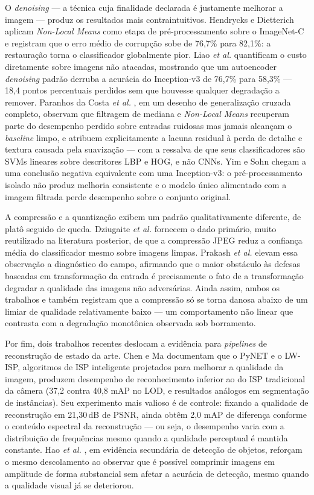 \documentclass[conference]{IEEEtran}
\begin{document}
O \textit{denoising} --- a técnica cuja finalidade declarada é justamente
melhorar a imagem --- produz os resultados mais contraintuitivos. Hendrycks e
Dietterich \cite{b6} aplicam \textit{Non-Local Means} como etapa de
pré-processamento sobre o ImageNet-C e registram que o erro médio de corrupção
sobe de 76,7\% para 82,1\%: a restauração torna o classificador globalmente
pior. Liao \textit{et al.} \cite{b7} quantificam o custo diretamente sobre
imagens não atacadas, mostrando que um autoencoder \textit{denoising} padrão
derruba a acurácia do Inception-v3 de 76,7\% para 58,3\% --- 18,4 pontos
percentuais perdidos sem que houvesse qualquer degradação a remover. Paranhos
da Costa \textit{et al.} \cite{b8}, em um desenho de generalização cruzada
completo, observam que filtragem de mediana e \textit{Non-Local Means}
recuperam parte do desempenho perdido sobre entradas ruidosas mas jamais
alcançam o \textit{baseline} limpo, e atribuem explicitamente a lacuna residual
à perda de detalhe e textura causada pela suavização --- com a ressalva de que
seus classificadores são SVMs lineares sobre descritores LBP e HOG, e não CNNs.
Yim e Sohn \cite{b9} chegam a uma conclusão negativa equivalente com uma
Inception-v3: o pré-processamento isolado não produz melhoria consistente e o
modelo único alimentado com a imagem filtrada perde desempenho sobre o conjunto
original.

A compressão e a quantização exibem um padrão qualitativamente diferente, de
platô seguido de queda. Dziugaite \textit{et al.} \cite{b10} fornecem o dado
primário, muito reutilizado na literatura posterior, de que a compressão JPEG
reduz a confiança média do classificador mesmo sobre imagens limpas. Prakash
\textit{et al.} \cite{b11} elevam essa observação a diagnóstico do campo,
afirmando que o maior obstáculo às defesas baseadas em transformação da entrada
é precisamente o fato de a transformação degradar a qualidade das imagens não
adversárias. Ainda assim, ambos os trabalhos e também \cite{b1} registram que a
compressão só se torna danosa abaixo de um limiar de qualidade relativamente
baixo --- um comportamento não linear que contrasta com a degradação monotônica
observada sob borramento.

Por fim, dois trabalhos recentes deslocam a evidência para \textit{pipelines}
de reconstrução de estado da arte. Chen e Ma \cite{b12} documentam que o PyNET
e o LW-ISP, algoritmos de ISP inteligente projetados para melhorar a qualidade
da imagem, produzem desempenho de reconhecimento inferior ao do ISP tradicional
da câmera (37,2 contra 40,8 mAP no LOD, e resultados análogos em segmentação de
instâncias). Seu experimento mais valioso é de controle: fixando a qualidade de
reconstrução em 21,30\,dB de PSNR, ainda obtêm 2,0 mAP de diferença conforme o
conteúdo espectral da reconstrução --- ou seja, o desempenho varia com a
distribuição de frequências mesmo quando a qualidade perceptual é mantida
constante. Hao \textit{et al.} \cite{b13}, em evidência secundária de detecção
de objetos, reforçam o mesmo descolamento ao observar que é possível comprimir
imagens em amplitude de forma substancial sem afetar a acurácia de detecção,
mesmo quando a qualidade visual já se deteriorou.
\end{document}
